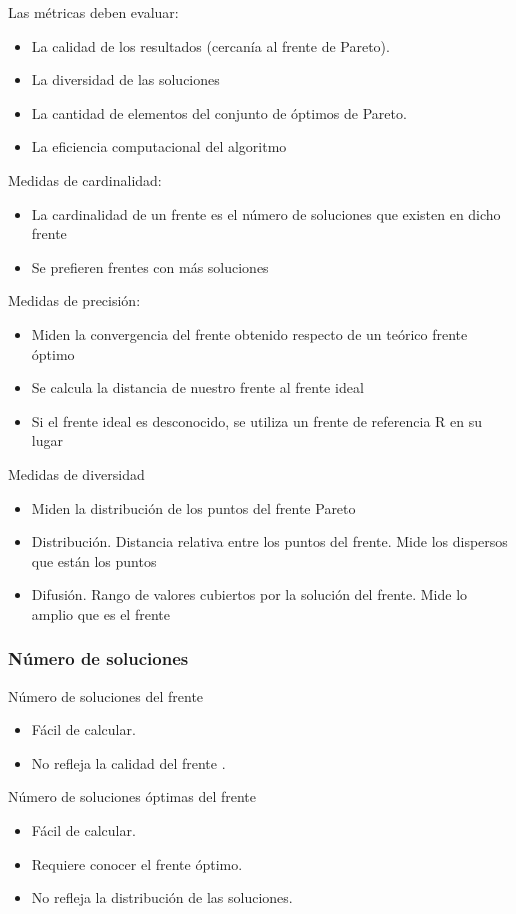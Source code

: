 \documentclass[12pt, twoside, openright]{report} %
\begin{document}
Las métricas deben evaluar:
\begin{itemize}
	\item La calidad de los resultados (cercanía al frente de Pareto).
	\item La diversidad de las soluciones
	\item La cantidad de elementos del conjunto de óptimos de Pareto.
	\item La eficiencia computacional del algoritmo
\end{itemize}

Medidas de cardinalidad:
\begin{itemize}
	\item La cardinalidad de un frente es el número de soluciones que existen en dicho frente
	\item Se prefieren frentes con más soluciones
\end{itemize}
Medidas de precisión:
\begin{itemize}
	\item Miden la convergencia del frente obtenido respecto de un teórico frente óptimo
	\item Se calcula la distancia de nuestro frente al frente ideal
	\item Si el frente ideal es desconocido, se utiliza un frente de referencia R en su lugar
\end{itemize}
Medidas de diversidad
\begin{itemize}
	\item Miden la distribución de los puntos del frente Pareto
	\item Distribución. Distancia relativa entre los puntos del frente. Mide los dispersos que están los puntos
	\item Difusión. Rango de valores cubiertos por la solución del frente. Mide lo amplio que es el frente
\end{itemize}

\subsubsection{Número de soluciones}
Número de soluciones del frente
\begin{itemize}
	\item Fácil de calcular.
	\item No refleja la calidad del frente .
\end{itemize}
Número de soluciones óptimas del frente
\begin{itemize}
	\item Fácil de calcular.
	\item Requiere conocer el frente óptimo.
	\item No refleja la distribución de las soluciones.
\end{itemize}
\end{document}
